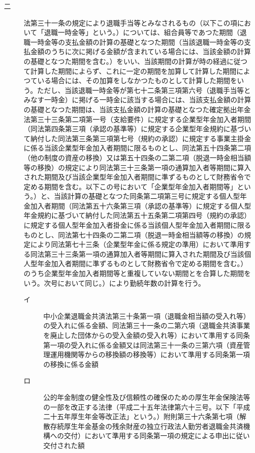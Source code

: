 \documentclass[twocolumn,a4j,10pt]{ltjtarticle}
\begin{document}
\begin{description}
\begin{description}
\item[二]法第三十一条の規定により退職手当等とみなされるもの（以下この項において「退職一時金等」という。）については、組合員等であつた期間（退職一時金等の支払金額の計算の基礎となつた期間（当該退職一時金等の支払金額のうちに次に掲げる金額が含まれている場合には、当該金額の計算の基礎となつた期間を含む。）をいい、当該期間の計算が時の経過に従つて計算した期間によらず、これに一定の期間を加算して計算した期間によつている場合には、その加算をしなかつたものとして計算した期間をいう。ただし、当該退職一時金等が第七十二条第三項第六号（退職手当等とみなす一時金）に掲げる一時金に該当する場合には、当該支払金額の計算の基礎となつた期間は、当該支払金額の計算の基礎となつた確定拠出年金法第三十三条第二項第一号（支給要件）に規定する企業型年金加入者期間（同法第四条第三項（承認の基準等）に規定する企業型年金規約に基づいて納付した同法第三条第三項第七号（規約の承認）に規定する事業主掛金に係る当該企業型年金加入者期間に限るものとし、同法第五十四条第二項（他の制度の資産の移換）又は第五十四条の二第二項（脱退一時金相当額等の移換）の規定により同法第三十三条第一項の通算加入者等期間に算入された期間及び当該企業型年金加入者期間に準ずるものとして財務省令で定める期間を含む。以下この号において「企業型年金加入者期間等」という。）と、当該計算の基礎となつた同条第二項第三号に規定する個人型年金加入者期間（同法第五十六条第三項（承認の基準等）に規定する個人型年金規約に基づいて納付した同法第五十五条第二項第四号（規約の承認）に規定する個人型年金加入者掛金に係る当該個人型年金加入者期間に限るものとし、同法第七十四条の二第二項（脱退一時金相当額等の移換）の規定により同法第七十三条（企業型年金に係る規定の準用）において準用する同法第三十三条第一項の通算加入者等期間に算入された期間及び当該個人型年金加入者期間に準ずるものとして財務省令で定める期間を含む。）のうち企業型年金加入者期間等と重複していない期間とを合算した期間をいう。次号において同じ。）により勤続年数の計算を行う。
\begin{description}
\item[イ]中小企業退職金共済法第三十条第一項（退職金相当額の受入れ等）の受入れに係る金額、同法第三十一条の二第六項（退職金共済事業を廃止した団体からの受入金額の受入れ等）において準用する同条第一項の受入れに係る金額又は同法第三十一条の三第六項（資産管理運用機関等からの移換額の移換等）において準用する同条第一項の移換に係る金額
\item[ロ]公的年金制度の健全性及び信頼性の確保のための厚生年金保険法等の一部を改正する法律（平成二十五年法律第六十三号。以下「平成二十五年厚生年金等改正法」という。）附則第三十六条第七項（解散存続厚生年金基金の残余財産の独立行政法人勤労者退職金共済機構への交付）において準用する同条第一項の規定による申出に従い交付された額

\end{description}
\end{description}
\end{description}
\end{document}
